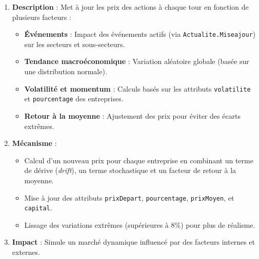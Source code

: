 \begin{enumerate}
    \item \textbf{Description} : Met à jour les prix des actions à chaque tour en fonction de plusieurs facteurs :
    \begin{itemize}
        \item \textbf{Événements} : Impact des événements actifs (via \texttt{Actualite.Miseajour}) sur les secteurs et sous-secteurs.
        \item \textbf{Tendance macroéconomique} : Variation aléatoire globale (basée sur une distribution normale).
        \item \textbf{Volatilité et momentum} : Calculs basés sur les attributs \texttt{volatilite} et \texttt{pourcentage} des entreprises.
        \item \textbf{Retour à la moyenne} : Ajustement des prix pour éviter des écarts extrêmes.
    \end{itemize}
    
    \item \textbf{Mécanisme} :
    \begin{itemize}
        \item Calcul d'un nouveau prix pour chaque entreprise en combinant un terme de dérive (\emph{drift}), un terme stochastique et un facteur de retour à la moyenne.
        \item Mise à jour des attributs \texttt{prixDepart}, \texttt{pourcentage}, \texttt{prixMoyen}, et \texttt{capital}.
        \item Lissage des variations extrêmes (supérieures à 8\%) pour plus de réalisme.
    \end{itemize}
    
    \item \textbf{Impact} : Simule un marché dynamique influencé par des facteurs internes et externes.
\end{enumerate}


